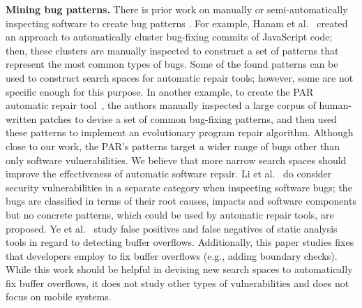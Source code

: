 \textbf{Mining bug patterns.} There is prior work on manually or semi-automatically inspecting software to create bug patterns \cite{hanam2016discovering, kim2013automatic,ye2016empirical,li2006have}.
For example, Hanam et al.~\cite{hanam2016discovering} created an approach to automatically cluster bug-fixing commits of JavaScript code; then, these clusters are manually inspected to construct a set of patterns that represent the most common types of bugs.
Some of the found patterns can be used to construct search spaces for automatic repair tools; however, some are not specific enough for this purpose. 
In another example, to create the PAR automatic repair tool~\cite{kim2013automatic}, the authors manually inspected a large corpus of human-written patches to devise a set of common bug-fixing patterns, and then used these patterns to implement an evolutionary program repair algorithm.
Although close to our work, the PAR's patterns target a wider range of bugs other than only software vulnerabilities.
We believe that more narrow search spaces should improve the effectiveness of automatic software repair.
Li et al.~\cite{li2006have} do consider security vulnerabilities in a separate category when inspecting software bugs; the bugs are classified in terms of their root causes, impacts and software components but no concrete patterns, which could be used by automatic repair tools, are proposed.
Ye et al.~\cite{ye2016empirical} study false positives and false negatives of static analysis tools in regard to detecting buffer overflows.
Additionally, this paper studies fixes that developers employ to fix buffer overflows (e.g., adding boundary checks).
While this work should be helpful in devising new search spaces to automatically fix buffer overflows, it does not study other types of vulnerabilities and does not focus on mobile systems.

